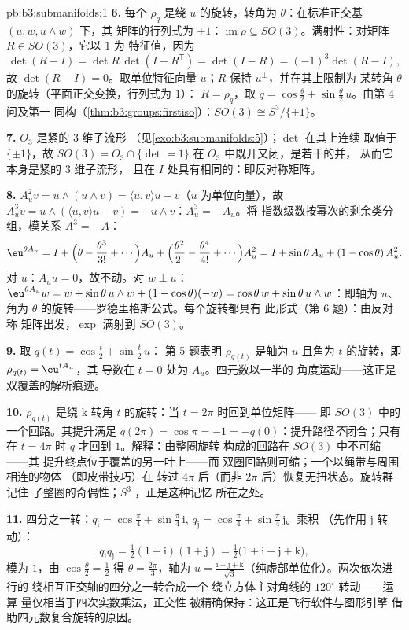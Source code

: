 \begin{solution}{pb:b3:submanifolds:1}
\textbf{6.} 每个 $\rho_q$ 是绕 $u$ 的旋转，转角为
$\theta$：在标准正交基 $(u, w, u\wedge w)$ 下，其
矩阵的行列式为 $+1$：$\operatorname{im}\rho \subseteq
SO(3)$。满射性：对矩阵 $R \in SO(3)$，它以 $1$ 为
特征值，因为
\[
\det(R - I) = \det R\,\det(I - R^{\mathsf T}) = \det(I - R)
= (-1)^3\det(R - I),
\]
故 $\det(R - I) = 0$。取单位特征向量 $u$；$R$
保持 $u^\perp$，并在其上限制为
某转角 $\theta$ 的旋转（平面正交变换，行列式为 $1$）：
$R = \rho_q$，取 $q = \cos\frac\theta2 +
\sin\frac\theta2\,u$。由第 4 问及第一
同构（\cref{thm:b3:groups:firstiso}）：$SO(3)
\cong S^3/\{\pm1\}$。

\textbf{7.} $O_3$ 是紧的 $3$ 维子流形
（见\cref{exo:b3:submanifolds:5}）；$\det$ 在其上连续
取值于 $\{\pm1\}$，故 $SO(3) = O_3\cap\{\det = 1\}$
在 $O_3$ 中既开又闭，是若干的并，
从而它本身是紧的 $3$ 维子流形，
且在 $I$ 处具有相同的：即反对称矩阵。

\textbf{8.} $A_u^2v = u\wedge(u\wedge v) = \langle u,
v\rangle u - v$（$u$ 为单位向量），故 $A_u^3v = u\wedge(\langle
u,v\rangle u - v) = -u\wedge v$：$A_u^3 = -A_u$。将
指数级数按幂次的剩余类分组，模关系
$A^3 = -A$：
\[
\eu^{\theta A_u} = I + \Bigl(\theta - \frac{\theta^3}{3!} +
\cdots\Bigr)A_u + \Bigl(\frac{\theta^2}{2!} -
\frac{\theta^4}{4!} + \cdots\Bigr)A_u^2
= I + \sin\theta\,A_u + (1 - \cos\theta)\,A_u^2 .
\]
对 $u$：$A_uu = 0$，故不动。对 $w \perp u$：$\eu^{\theta
A_u}w = w + \sin\theta\,u\wedge w + (1 - \cos\theta)(-w) =
\cos\theta\,w + \sin\theta\,u\wedge w$：即轴为
$u$、角为 $\theta$ 的旋转——罗德里格斯公式。每个旋转都具有
此形式（第 6 题）：由反对称
矩阵出发，$\exp$ 满射到 $SO(3)$。

\textbf{9.} 取 $q(t) = \cos\frac t2 + \sin\frac t2\,u$：
第 5 题表明 $\rho_{q(t)}$ 是轴为 $u$
且角为 $t$ 的旋转，即 $\rho_{q(t)} = \eu^{tA_u}$，其
导数在 $t = 0$ 处为 $A_u$。四元数以一半的
角度运动——这正是双覆盖的解析痕迹。

\textbf{10.} $\rho_{q(t)}$ 是绕 $\mathrm k$
转角 $t$ 的旋转：当 $t = 2\pi$ 时回到单位矩阵——
即 $SO(3)$ 中的一个回路。其提升满足 $q(2\pi) = \cos\pi =
-1 = -q(0)$：提升路径\emph{不}闭合；只有在
$t = 4\pi$ 时 $q$ 才回到 $1$。解释：由整圈旋转
构成的回路在 $SO(3)$ 中不可缩——其
提升终点位于覆盖的另一叶上——而
双圈回路则可缩；一个以绳带与周围相连的物体
（即皮带技巧）在
转过 $4\pi$ 后（而非 $2\pi$ 后）恢复无扭状态。旋转群记住
了整圈的奇偶性；$S^3$ ，正是这种记忆
所在之处。

\textbf{11.} 四分之一转：$q_{\mathrm i} =
\cos\frac\pi4 + \sin\frac\pi4\,\mathrm i$, $q_{\mathrm j} =
\cos\frac\pi4 + \sin\frac\pi4\,\mathrm j$。乘积
（先作用 $\mathrm j$ 转动）：
\[
q_{\mathrm i}q_{\mathrm j} = \tfrac12(1 + \mathrm i)(1 +
\mathrm j) = \tfrac12\bigl(1 + \mathrm i + \mathrm j +
\mathrm k\bigr),
\]
模为 $1$，由 $\cos\frac\theta2 = \frac12$ 得 $\theta =
\frac{2\pi}3$，轴为 $u = \frac{\mathrm i + \mathrm j +
\mathrm k}{\sqrt3}$（纯虚部单位化）。两次依次进行的
绕相互正交轴的四分之一转合成一个
绕立方体主对角线的 $120^\circ$ 转动——运算
量仅相当于四次实数乘法，正交性
被精确保持：这正是飞行软件与图形引擎
借助四元数复合旋转的原因。


\end{solution}
